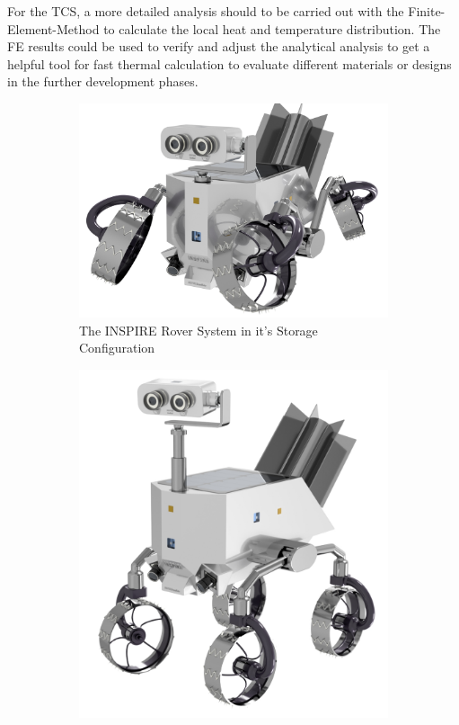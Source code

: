 For the TCS, a more detailed analysis should to be carried out with the Finite-Element-Method to calculate the local heat and temperature distribution.
The FE results could be used to verify and adjust the analytical analysis to get a helpful tool for fast thermal calculation to evaluate different materials or designs in the further development phases.

\begin{figure}[htb]
     \centering
     \begin{subfigure}[b]{0.49\textwidth}
         \centering
         \includegraphics[width=\textwidth]{Media/INSPIRE Mk6_HighRes_Stowage_config}
         \caption{The INSPIRE Rover System in it's Storage Configuration}
         \label{fig:EndStorageConfig}
     \end{subfigure}
     \hfill
     \begin{subfigure}[b]{0.49\textwidth}
         \centering
         \includegraphics[width=\textwidth]{Media/INSPIRE Mk6_HighRes_Exploration}

\end{subfigure}
\end{figure}
